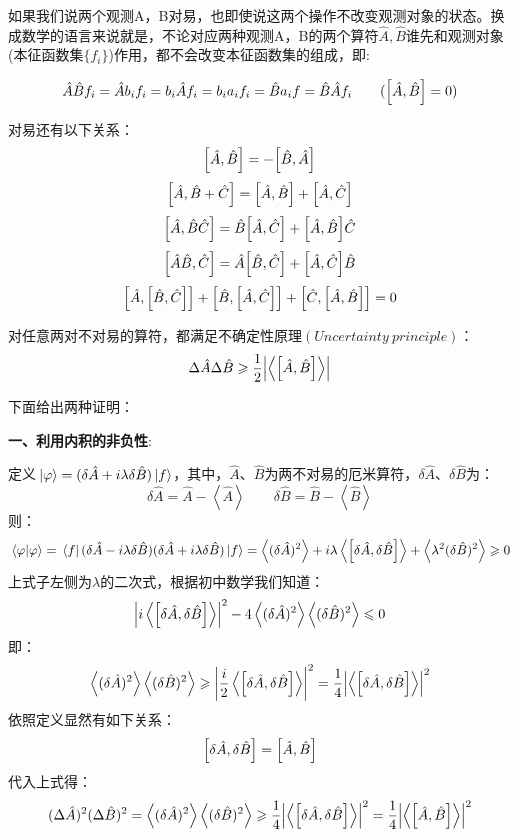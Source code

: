 如果我们说两个观测A，B对易，也即使说这两个操作不改变观测对象的状态。换成数学的语言来说就是，不论对应两种观测A，B的两个算符$\hat{A},\hat{B}$谁先和观测对象(本征函数集$\{f_i\}$)作用，都不会改变本征函数集的组成，即:

\[\hat{A}\hat{B}f_i=\hat{A}b_if_i=b_i\hat{A}f_i=b_ia_if_i=\hat{B}a_if=\hat{B}\hat{A}f_i \qquad (\comm{\hat{A}}{\hat{B}}=0)\]

对易还有以下关系：
\[\comm{\hat{A}}{\hat{B}}=-\comm{\hat{B}}{\hat{A}}\]
\[\comm{\hat{A}}{\hat{B}+\hat{C}}=\comm{\hat{A}}{\hat{B}}+\comm{\hat{A}}{\hat{C}}\]
\[\comm{\hat{A}}{\hat{B}\hat{C}}=\hat{B}\comm{\hat{A}}{\hat{C}}+\comm{\hat{A}}{\hat{B}}\hat{C}\]
\[\comm{\hat{A}\hat{B}}{\hat{C}}=\hat{A}\comm{\hat{B}}{\hat{C}}+\comm{\hat{A}}{\hat{C}}\hat{B}\]
\[\comm{\hat{A}}{\comm{\hat{B}}{\hat{C}}}+\comm{\hat{B}}{\comm{\hat{A}}{\hat{C}}}+\comm{\hat{C}}{\comm{\hat{A}}{\hat{B}}}=0\]

对任意两对不对易的算符，都满足不确定性原理$(Uncertainty \ principle)$：
\[\Delta \hat{A}\Delta \hat{B} \geqslant \frac{1}{2}\qty|\left \langle \comm{\hat{A}}{\hat{B}} \right \rangle|\]

下面给出两种证明：

\textbf{一、利用内积的非负性}:

定义$\ket*{\varphi}=(\delta\hat{A}+i\lambda \delta\hat{B})\ket*{f}$，其中，$\hat{A}$、$\hat{B}$为两不对易的厄米算符，$\delta\hat{A}$、$\delta\hat{B}$为：
\[\delta\hat{A}=\hat{A}-\left \langle \hat{A} \right \rangle \qquad \delta\hat{B}=\hat{B}-\left \langle \hat{B} \right \rangle\]
则：
\[\bra*{\varphi}\ket*{\varphi}=\bra*{f}(\delta\hat{A}-i\lambda \delta\hat{B})(\delta\hat{A}+i\lambda \delta\hat{B})\ket*{f} = \left \langle (\delta\hat{A})^2 \right \rangle+i\lambda\left \langle \comm{\delta\hat{A}}{\delta\hat{B}} \right \rangle+\left \langle \lambda^2(\delta\hat{B})^2 \right \rangle \geqslant 0\]
上式子左侧为$\lambda$的二次式，根据初中数学我们知道：
\[\left |i\left \langle \comm{\delta\hat{A}}{\delta\hat{B}} \right \rangle\right |^2-4\left \langle (\delta\hat{A})^2 \right \rangle\left \langle (\delta\hat{B})^2 \right \rangle \leqslant 0\]
即：
\[\left \langle (\delta\hat{A})^2 \right \rangle\left \langle (\delta\hat{B})^2 \right \rangle \geqslant \qty|\frac{i}{2}\left \langle \comm{\delta\hat{A}}{\delta\hat{B}} \right \rangle|^2=\frac{1}{4}\qty|\left \langle \comm{\delta\hat{A}}{\delta\hat{B}} \right \rangle|^2\]
依照定义显然有如下关系：
\[\comm{\delta\hat{A}}{\delta\hat{B}}=\comm{\hat{A}}{\hat{B}}\]
代入上式得：
\[(\Delta \hat{A})^2(\Delta \hat{B})^2 = \left \langle (\delta\hat{A})^2 \right \rangle\left \langle (\delta\hat{B})^2 \right \rangle \geqslant \frac{1}{4}\qty|\left \langle \comm{\delta\hat{A}}{\delta\hat{B}} \right \rangle|^2=\frac{1}{4}\qty|\left \langle \comm{\hat{A}}{\hat{B}} \right \rangle|^2\]

